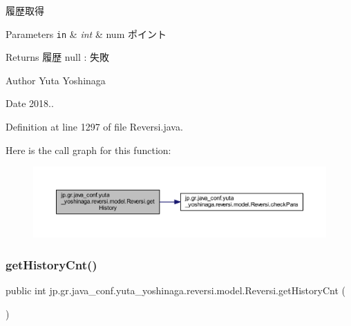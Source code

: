 履歴取得 


\begin{DoxyParams}[1]{Parameters}
\mbox{\tt in}  & {\em int} & num ポイント \\
\hline
\end{DoxyParams}
\begin{DoxyReturn}{Returns}
履歴 null \+: 失敗 
\end{DoxyReturn}
\begin{DoxyAuthor}{Author}
Yuta Yoshinaga 
\end{DoxyAuthor}
\begin{DoxyDate}{Date}
2018.. 
\end{DoxyDate}


Definition at line 1297 of file Reversi.\+java.

Here is the call graph for this function\+:\nopagebreak
\begin{figure}[H]
\begin{center}
\leavevmode
\includegraphics[width=350pt]{classjp_1_1gr_1_1java__conf_1_1yuta__yoshinaga_1_1reversi_1_1model_1_1_reversi_af781f5ebb4fb33b574ec58acfb45a796_cgraph}
\end{center}
\end{figure}
\mbox{\label{classjp_1_1gr_1_1java__conf_1_1yuta__yoshinaga_1_1reversi_1_1model_1_1_reversi_a286949e070d0cfc8a1d9562a298b7b98}} 
\subsubsection{\texorpdfstring{get\+History\+Cnt()}{getHistoryCnt()}}
{\footnotesize\ttfamily public int jp.\+gr.\+java\+\_\+conf.\+yuta\+\_\+yoshinaga.\+reversi.\+model.\+Reversi.\+get\+History\+Cnt (\begin{DoxyParamCaption}{ }\end{DoxyParamCaption})}



